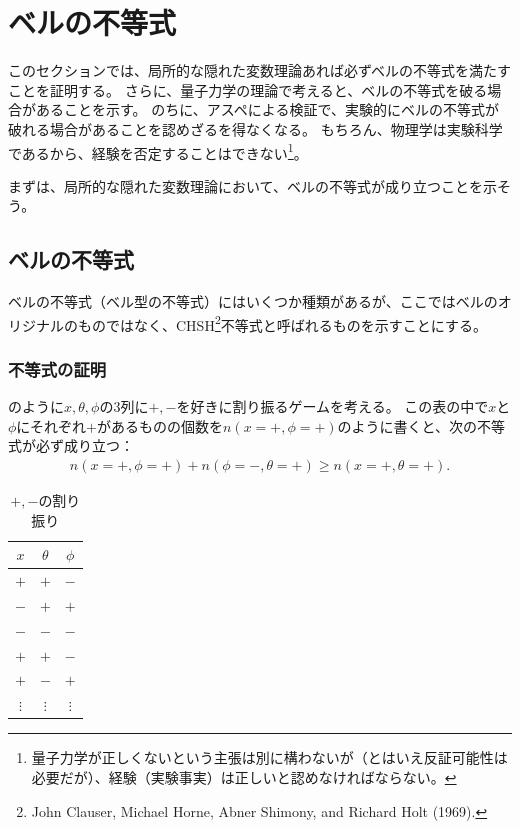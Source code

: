\documentclass[10pt,b5paper,papersize,dvipdfmx]{jsbook}
\begin{document}
\fi
\ifsecII
\section{ベルの不等式}

このセクションでは、局所的な隠れた変数理論あれば必ずベルの不等式を満たすことを証明する。
さらに、量子力学の理論で考えると、ベルの不等式を破る場合があることを示す。
のちに、アスペによる検証で、実験的にベルの不等式が破れる場合があることを認めざるを得なくなる。
もちろん、物理学は実験科学であるから、経験を否定することはできない\footnote{
  量子力学が正しくないという主張は別に構わないが（とはいえ反証可能性は必要だが）、経験（実験事実）は正しいと認めなければならない。
}。\par
まずは、局所的な隠れた変数理論において、ベルの不等式が成り立つことを示そう。

%
\subsection{ベルの不等式} %

ベルの不等式（ベル型の不等式）にはいくつか種類があるが、ここではベルのオリジナルのものではなく、CHSH\footnote{
  John Clauser, Michael Horne, Abner Shimony, and Richard Holt (1969).
}不等式と呼ばれるものを示すことにする。


%
\subsubsection{不等式の証明}
のように$x, \theta, \phi$の3列に$+, -$を好きに割り振るゲームを考える。
この表の中で$x$と$\phi$にそれぞれ$+$があるものの個数を$n(x=+,\phi=+)$のように書くと、次の不等式が必ず成り立つ：
\begin{align}
  n(x=+,\phi=+) + n(\phi=-,\theta=+) \ge n(x=+,\theta=+).
  \label{eq:bell's ineq}
\end{align}

\begin{table}[htbp]
  \centering
  \caption{$+, -$の割り振り}
  \label{tab:pm}
  \begin{tabular}{ccc} \hline
    $x$ & $\theta$ & $\phi$ \\ \hline
    $+$ & $+$ & $-$ \\
    $-$ & $+$ & $+$ \\
    $-$ & $-$ & $-$ \\
    $+$ & $+$ & $-$ \\
    $+$ & $-$ & $+$ \\
    $\vdots$ & $\vdots$ & $\vdots$ \\ \hline
  \end{tabular}
\end{table}
\end{document}
